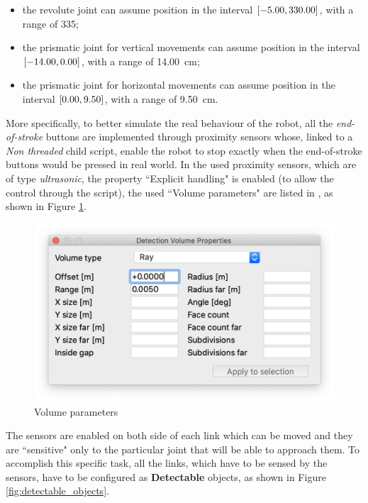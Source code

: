 \begin{itemize}
    \item the revolute joint can assume position in the interval $\interval{-5.00}{330.00}$, with a range of 335\degree;
    \item the prismatic joint for vertical movements can assume position in the interval  $\interval{-14.00}{0.00}$, with a range of \SI{14.00}{\centi\metre};
    \item the prismatic joint for horizontal movements can assume position in the interval  $\interval{0.00}{9.50}$, with a range of \SI{9.50}{\centi\metre}.
\end{itemize}

More specifically, to better simulate the real behaviour of the robot, all the \textit{end-of-stroke} buttons are implemented through proximity sensors whose, linked to a \textit{Non threaded} child script, enable the robot to stop exactly when the end-of-stroke buttons would be pressed in real world. In the used proximity sensors, which are of type \textit{ultrasonic}, the property ``Explicit handling" is enabled (to allow the control through the script), the used ``Volume parameters" are listed in , as shown in Figure \ref{fig:volume_parameters}.

\begin{figure}[h]
\begin{center}
\includegraphics[width=0.5\linewidth]{capitolo3/figure/volume_parameters}
\caption{Volume parameters}
\label{fig:volume_parameters} 
\end{center}
\end{figure}

The sensors are enabled on both side of each link which can be moved and they are ``sensitive" only to the particular joint that will be able to approach them. To accomplish this specific task, all the links, which have to be sensed by the sensors, have to be configured as \textbf{Detectable} objects, as shown in Figure \ref{fig:detectable_objects}.

